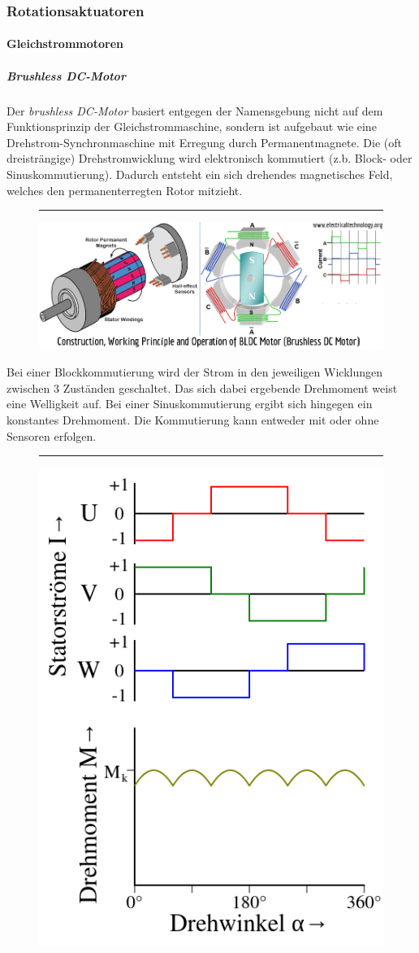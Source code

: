 			\subsubsection{Rotationsaktuatoren}
				\paragraph{Gleichstrommotoren} 
					\subparagraph{Brushless DC-Motor}
						\begin{description}[leftmargin=3cm]
							\item[Aufbau] 
							Der \textit{brushless DC-Motor} basiert entgegen der Namensgebung nicht auf dem Funktionsprinzip der Gleichstrommaschine, sondern ist aufgebaut wie eine Drehstrom-Synchronmaschine mit Erregung durch Permanentmagnete. Die (oft dreisträngige) Drehstromwicklung wird elektronisch kommutiert (z.b. Block- oder Sinuskommutierung). Dadurch entsteht ein sich drehendes magnetisches Feld, welches den permanenterregten Rotor mitzieht.
							\begin{figure}[h]
								\centering \rule{3cm}{0cm}
								\includegraphics[width=0.82\linewidth]{./pics/el/brushless}
							\end{figure}
							\item[Kommutierungsarten]
							Bei einer Blockkommutierung wird der Strom in den jeweiligen Wicklungen zwischen 3 Zuständen geschaltet. Das sich dabei ergebende Drehmoment weist eine Welligkeit auf. Bei einer Sinuskommutierung ergibt sich hingegen ein konstantes Drehmoment. Die Kommutierung kann entweder mit oder ohne Sensoren erfolgen.
							\begin{figure}[h]
								\centering \rule{1cm}{0cm}
								\includegraphics[width=0.3\linewidth]{./pics/el/blockkomm}
							\end{figure} 
							

\end{description}
